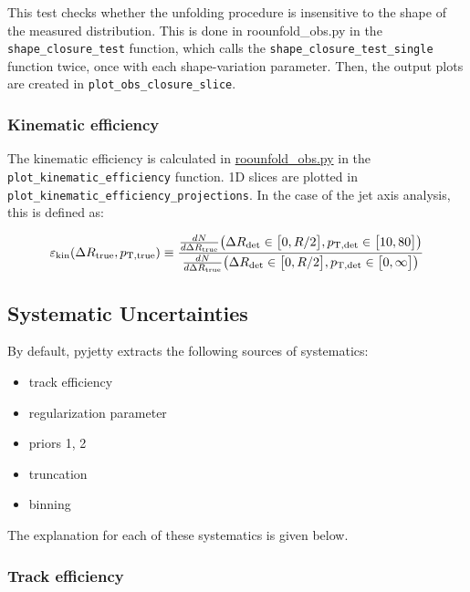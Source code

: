 \documentclass[12pt]{article}
\begin{document}
\begin{enumerate}
This test checks whether the unfolding procedure is insensitive to the 
shape of the measured distribution.
This is done in roounfold\_obs.py in the \verb|shape_closure_test| function, which calls the
\verb|shape_closure_test_single| function twice, once with each shape-variation parameter.
Then, the output plots are created in \verb|plot_obs_closure_slice|.

\subsubsection{Kinematic efficiency}

The kinematic efficiency is calculated in \href{https://github.com/reynier0611/pyjetty/blob/master/pyjetty/alice_analysis/analysis/user/substructure/roounfold_obs.py}{roounfold\_obs.py} in the \verb|plot_kinematic_efficiency| function.
1D slices are plotted in \verb|plot_kinematic_efficiency_projections|. In the case of the jet axis analysis, this is defined as:

\begin{equation}
\varepsilon_{\rm kin}(\Delta R_{\rm true} , p_{\rm T, true}) \equiv \frac{\frac{dN}{d\Delta R_{\rm true}}\big(\Delta R_{\rm det}\in \big[0,R/2\big],p_{\rm T, det} \in \big[10,80\big]\big)}{\frac{dN}{d\Delta R_{\rm true}}\big(\Delta R_{\rm det}\in \big[0,R/2\big],p_{\rm T, det} \in \big[0,\infty\big]\big)}
\end{equation}

\end{enumerate}

\subsection{Systematic Uncertainties}

By default, pyjetty extracts the following sources of systematics:

\begin{itemize}
\item track efficiency
\item regularization parameter
\item priors 1, 2
\item truncation
\item binning
\end{itemize}

The explanation for each of these systematics is given below.

\subsubsection{Track efficiency}
\end{document}
